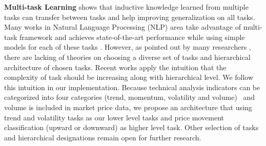 \documentclass[sigconf, anonymous, review]{acmart}
\renewcommand{\citename}{\citet}
\renewcommand{\cite}{\citep}
\begin{document}
\textbf{Multi-task Learning} \citename{caruana1993multitask}
shows that inductive knowledge learned from multiple tasks can
transfer between tasks and help improving generalization on all
tasks. Many works in Natural Language Processing (NLP) area take
advantage of multi-task framework and achieves state-of-the-art
performance while using simple models for each of these tasks
\cite{sogaard2016deep,hashimoto2016joint}. However, as pointed
out by many researchers
\cite{caruana1993multitask,ruder2017overview}, there are lacking
of theories on choosing a diverse set of tasks and hierarchical
architecture of chosen tasks. Recent works
\cite{sogaard2016deep,hashimoto2016joint} apply the intuition
that the complexity of task should be increasing along with
hierarchical level. We follow this intuition in our
implementation. Because technical analysis indicators can be
categorized into four categories (trend, momentum, volatility and
volume)~\cite{kirkpatrick2010technical} and volume is included in
market price data, we propose an architecture that using trend
and volatility tasks as our lower level tasks and price movement
classification (upward or downward) as higher level task. Other
selection of tasks and hierarchical designations remain open for
further research.




\end{document}
